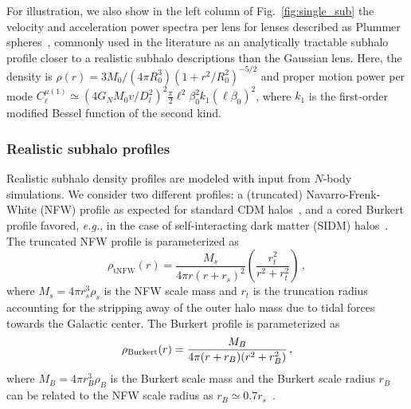 \documentclass[twocolumn]{aastex63}
\begin{document}
For illustration, we also show in the left column of Fig.~\ref{fig:single_sub} the velocity and acceleration power spectra per lens for lenses described as Plummer spheres~\cite{Plummer:1911zza}, commonly used in the literature as an analytically tractable subhalo profile closer to a realistic subhalo descriptions than the Gaussian lens. Here, the density is $\rho(r)= 3M_0/(4\pi R_0^3)(1 + r^2/R_0^2)^{-5/2}$ and proper motion power per mode $C_{\ell}^{\mu (1)} \simeq \left({4 G_N M_0 v/D_l^2}\right)^2 \frac{\pi}{2} \ell^2\beta_0^2 k_1(\ell \beta_0)^2$, where $k_1$ is the first-order modified Bessel function of the second kind.

\subsubsection{Realistic subhalo profiles}

Realistic subhalo density profiles are modeled with input from $N$-body simulations. We consider two different profiles: a (truncated) Navarro-Frenk-White (NFW) profile as expected for standard CDM halos~\cite{Navarro:1995iw,2008gady.book.....B}, and a cored Burkert profile favored, \emph{e.g.}, in the case of self-interacting dark matter (SIDM) halos~\cite{Burkert:1995yz}. The truncated NFW profile is parameterized as
\begin{equation}
\rho_\text{tNFW}(r)=\frac{M_s}{4\pi r(r + r_s)^2}\left(\frac{r_t^2}{r^2 + r_t^2}\right)\,,
\end{equation}
where $M_s = 4\pi r_s^3\rho_s$ is the NFW scale mass and $r_t$ is the truncation radius accounting for the stripping away of the outer halo mass due to tidal forces towards the Galactic center. The Burkert profile is parameterized as
\begin{equation}
\rho_{\rm Burkert}(r) = \frac{M_B}{4\pi(r+r_B)(r^2 + r_B^2)}\,,
\end{equation}
where $M_B = 4\pi r_B^3\rho_B$ is the Burkert scale mass and  the Burkert scale radius $r_B$ can be related to the NFW scale radius as $r_B \simeq 0.7 r_s$~\cite{Bartels:2015uba,Lisanti:2017qoz}.
\end{document}
